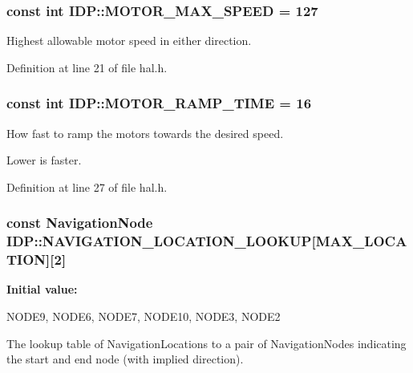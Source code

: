 \hypertarget{namespaceIDP_a4ead0b21ad2c507b542445695182d4cd}{
\subsubsection[{MOTOR\_\-MAX\_\-SPEED}]{\setlength{\rightskip}{0pt plus 5cm}const int {\bf IDP::MOTOR\_\-MAX\_\-SPEED} = 127}}
\label{namespaceIDP_a4ead0b21ad2c507b542445695182d4cd}


Highest allowable motor speed in either direction. 



Definition at line 21 of file hal.h.

\hypertarget{namespaceIDP_ab3a00a6cc8a6dba271e38d337daf4703}{
\subsubsection[{MOTOR\_\-RAMP\_\-TIME}]{\setlength{\rightskip}{0pt plus 5cm}const int {\bf IDP::MOTOR\_\-RAMP\_\-TIME} = 16}}
\label{namespaceIDP_ab3a00a6cc8a6dba271e38d337daf4703}


How fast to ramp the motors towards the desired speed. 

Lower is faster. 

Definition at line 27 of file hal.h.

\hypertarget{namespaceIDP_a33e1b72d66088b211bfeb61b18d7b63b}{
\subsubsection[{NAVIGATION\_\-LOCATION\_\-LOOKUP}]{\setlength{\rightskip}{0pt plus 5cm}const {\bf NavigationNode} {\bf IDP::NAVIGATION\_\-LOCATION\_\-LOOKUP}\mbox{[}MAX\_\-LOCATION\mbox{]}\mbox{[}2\mbox{]}}}
\label{namespaceIDP_a33e1b72d66088b211bfeb61b18d7b63b}
{\bfseries Initial value:}
\begin{DoxyCode}
 {
        {NODE9, NODE6}, 
        {NODE7, NODE10},
        {NODE3, NODE2}  
    }
\end{DoxyCode}


The lookup table of NavigationLocations to a pair of NavigationNodes indicating the start and end node (with implied direction). 



